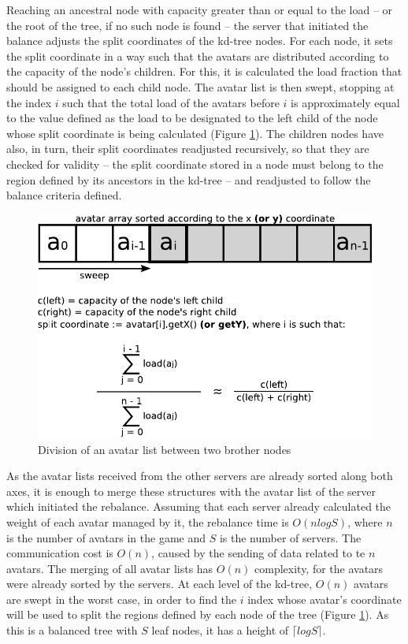Reaching an ancestral node with capacity greater than or equal to the load -- or the root of the tree, if no such node is found -- the server that initiated the balance adjusts the split coordinates of the kd-tree nodes. For each node, it sets the split coordinate in a way such that the avatars are distributed according to the capacity of the node's children. For this, it is calculated the load fraction that should be assigned to each child node. The avatar list is then swept, stopping at the index $i$ such that the total load of the avatars before $i$ is approximately equal to the value defined as the load to be designated to the left child of the node whose split coordinate is being calculated (Figure \ref{fig:balancenode}). The children nodes have also, in turn, their split coordinates readjusted recursively, so that they are checked for validity -- the split coordinate stored in a node must belong to the region defined by its ancestors in the kd-tree -- and readjusted to follow the balance criteria defined.

\begin{figure}
  \centering
  \includegraphics[width=0.9\linewidth]{images/balancenode}
  \caption{Division of an avatar list between two brother nodes}
   \label{fig:balancenode}
\end{figure}

As the avatar lists received from the other servers are already sorted along both axes, it is enough to merge these structures with the avatar list of the server which initiated the rebalance. Assuming that each server already calculated the weight of each avatar managed by it, the rebalance time is  $O(nlogS)$, where $n$ is the number of avatars in the game and $S$ is the number of servers. The communication cost is $O(n)$, caused by the sending of data related to te $n$ avatars. The merging of all avatar lists has $O(n)$ complexity, for the avatars were already sorted by the servers. At each level of the kd-tree, $O(n)$ avatars are swept in the worst case, in order to find the $i$ index whose avatar's coordinate will be used to split the regions defined by each node of the tree (Figure \ref{fig:balancenode}). As this is a balanced tree with $S$ leaf nodes, it has a height of $\lceil logS \rceil$.



